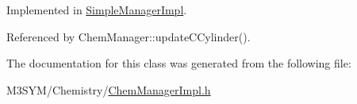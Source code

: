 Implemented in \hyperlink{classSimpleManagerImpl_af8546bec65b406009203066059f88052}{Simple\+Manager\+Impl}.



Referenced by Chem\+Manager\+::update\+C\+Cylinder().



The documentation for this class was generated from the following file\+:\begin{DoxyCompactItemize}
\item 
M3\+S\+Y\+M/\+Chemistry/\hyperlink{ChemManagerImpl_8h}{Chem\+Manager\+Impl.\+h}\end{DoxyCompactItemize}
